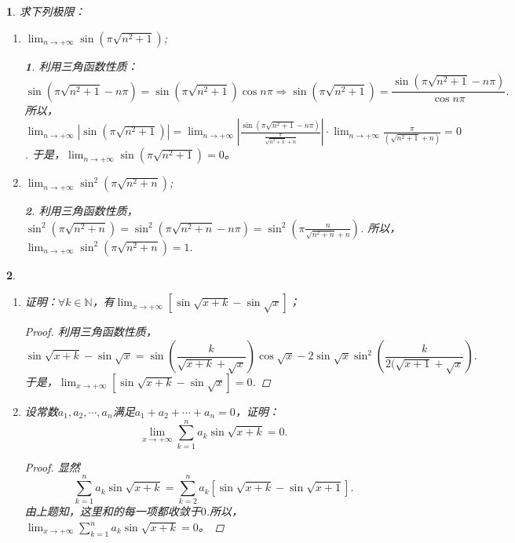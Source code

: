 \documentclass[utf8]{book}
\newtheorem{example}{}[section]             %
\newtheorem{solution}{}
\begin{document}
\begin{example}
求下列极限：
\renewcommand\labelenumi{\normalfont(\theenumi)}
\begin{enumerate}
\item $\displaystyle\lim_{n\to +\infty}\sin(\pi\sqrt{n^2+1})$;
\begin{solution}利用三角函数性质：
$$\sin(\pi\sqrt{n^2+1}-n\pi)=\sin(\pi\sqrt{n^2+1})\cos{n\pi}\Rightarrow \sin(\pi\sqrt{n^2+1})=\frac{\sin(\pi\sqrt{n^2+1}-n\pi)}{\cos{n\pi}}.$$
所以，
 $\displaystyle\lim_{n\to +\infty}\left|\sin(\pi\sqrt{n^2+1})\right| = \displaystyle\lim_{n\to +\infty}\left|\frac{\sin(\pi\sqrt{n^2+1}-n\pi)}{\frac{\pi}{\sqrt{n^2+1}+n}}\right|\cdot\displaystyle\lim_{n\to +\infty}\frac{\pi}{(\sqrt{n^2+1}+n)}=0$.
于是，$\displaystyle\lim_{n\to +\infty}\sin(\pi\sqrt{n^2+1})=0$。
\end{solution}
\item $\displaystyle\lim_{n\to +\infty}\sin^2(\pi\sqrt{n^2+n})$;
\begin{solution}利用三角函数性质，
$\sin^2(\pi\sqrt{n^2+n})=\sin^2(\pi\sqrt{n^2+n}-n\pi)=\sin^2\left(\pi\displaystyle\frac{n}{\sqrt{n^2+n}+n}\right)$.
所以，$\displaystyle\lim_{n\to +\infty}\sin^2(\pi\sqrt{n^2+n})=1.$
\end{solution}
\end{enumerate}
\end{example}
\begin{example}
\renewcommand\labelenumi{\normalfont(\theenumi)}
\begin{enumerate}
\item 证明：$\forall k\in\mathbb{N}$，有$\displaystyle\lim_{x\to +\infty}\left[\sin{\sqrt{x+k}}-\sin\sqrt{x}\right]$；
\begin{proof}利用三角函数性质，
$$\sin{\sqrt{x+k}}-\sin\sqrt{x}=\sin\left(\frac{k}{\sqrt{x+k}+\sqrt{x}}\right)\cos\sqrt{x}-2\sin\sqrt{x}\sin^2\left(\frac{k}{2(\sqrt{x+1}+\sqrt{x}}\right).$$
于是，$\displaystyle\lim_{x\to +\infty}\left[\sin{\sqrt{x+k}}-\sin\sqrt{x}\right]=0$.
\end{proof}
\item 设常数$a_1,a_2,\cdots,a_n$满足$a_1+a_2+\cdots+a_n=0$，证明：
$$\displaystyle\lim_{x\to +\infty}\displaystyle\sum_{k=1}^na_k\sin{\sqrt{x+k}}=0.$$
\begin{proof}显然
$$\displaystyle\sum_{k=1}^na_k\sin{\sqrt{x+k}}=\displaystyle\sum_{k=2}^na_k\left[\sin{\sqrt{x+k}}-\sin\sqrt{x+1}\right].$$
由上题知，这里和的每一项都收敛于$0$.所以，$\displaystyle\lim_{x\to +\infty}\displaystyle\sum_{k=1}^na_k\sin{\sqrt{x+k}}=0$。
\end{proof}
\end{enumerate}
\end{example}
\end{document}
